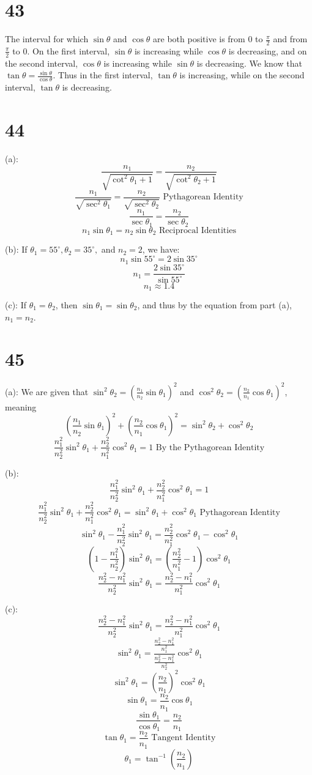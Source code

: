 \documentclass{article}
\theoremstyle{definition}
\newcommand{\?}{\stackrel{?}{=}}
\begin{document}
\section*{43}
The interval for which $\sin\theta$ and $\cos\theta$ are both positive is from $0$ to $\frac{\pi}{2}$ and from $\frac{\pi}{2}$ to $0$. On the first interval, $\sin\theta$ is increasing while 
$\cos\theta$ is decreasing, and on the second interval, $\cos\theta$ is increasing while $\sin\theta$ is decreasing. We know that $\tan\theta=\frac{\sin\theta}{\cos\theta}$. Thus in the first interval, 
$\tan\theta$ is increasing, while on the second interval, $\tan\theta$ is decreasing.

\section*{44}
(a): \[ \frac{n_1}{\sqrt{\cot^2\theta_1+1}}=\frac{n_2}{\sqrt{\cot^2\theta_2+1}} \]
\[ \frac{n_1}{\sqrt{\sec^2\theta_1}}=\frac{n_2}{\sqrt{\sec^2\theta_2}}\textrm{ Pythagorean Identity} \]
\[ \frac{n_1}{\sec\theta_1}=\frac{n_2}{\sec\theta_2} \]
\[ n_1\sin\theta_1=n_2\sin\theta_2\textrm{ Reciprocal Identities} \]


(b): If $\theta_1=55^\circ,\theta_2=35^\circ,$ and $n_2=2$, we have:
\[ n_1\sin 55^\circ=2\sin 35^\circ \]
\[ n_1=\frac{2\sin 35^\circ}{\sin 55^\circ} \]
\[ n_1\approx 1.4 \]


(c): If $\theta_1=\theta_2$, then $\sin\theta_1=\sin\theta_2$, and thus by the equation from part (a), $n_1=n_2$.

\section*{45}
(a): We are given that $\sin^2\theta_2=(\frac{n_1}{n_2}\sin\theta_1)^2$ and $\cos^2\theta_2=(\frac{n_2}{n_1}\cos\theta_1)^2$, meaning
\[ (\frac{n_1}{n_2}\sin\theta_1)^2+(\frac{n_2}{n_1}\cos\theta_1)^2=\sin^2\theta_2+\cos^2\theta_2 \]
\[ \frac{n_1^2}{n_2^2}\sin^2\theta_1+\frac{n_2^2}{n_1^2}\cos^2\theta_1=1\textrm{ By the Pythagorean Identity} \]


(b): \[ \frac{n_1^2}{n_2^2}\sin^2\theta_1+\frac{n_2^2}{n_1^2}\cos^2\theta_1=1 \]
\[ \frac{n_1^2}{n_2^2}\sin^2\theta_1+\frac{n_2^2}{n_1^2}\cos^2\theta_1=\sin^2\theta_1+\cos^2\theta_1\textrm{ Pythagorean Identity} \]
\[ \sin^2\theta_1-\frac{n_1^2}{n_2^2}\sin^2\theta_1=\frac{n_2^2}{n_1^2}\cos^2\theta_1-\cos^2\theta_1  \]
\[ (1-\frac{n_1^2}{n_2^2})\sin^2\theta_1=(\frac{n_2^2}{n_1^2}-1)\cos^2\theta_1 \]
\[ \frac{n_2^2-n_1^2}{n_2^2}\sin^2\theta_1=\frac{n_2^2-n_1^2}{n_1^2}\cos^2\theta_1 \]


(c): \[ \frac{n_2^2-n_1^2}{n_2^2}\sin^2\theta_1=\frac{n_2^2-n_1^2}{n_1^2}\cos^2\theta_1 \]
\[ \sin^2\theta_1=\dfrac{\frac{n_2^2-n_1^2}{n_1^2}}{\frac{n_2^2-n_1^2}{n_2^2}}\cos^2\theta_1 \]
\[ \sin^2\theta_1=(\frac{n_2}{n_1})^2\cos^2\theta_1 \]
\[ \sin\theta_1=\frac{n_2}{n_1}\cos\theta_1 \]
\[ \frac{\sin\theta_1}{\cos\theta_1}=\frac{n_2}{n_1} \]
\[ \tan\theta_1=\frac{n_2}{n_1}\textrm{ Tangent Identity} \]
\[ \theta_1=\tan^{-1}(\frac{n_2}{n_1}) \]
\end{document}
